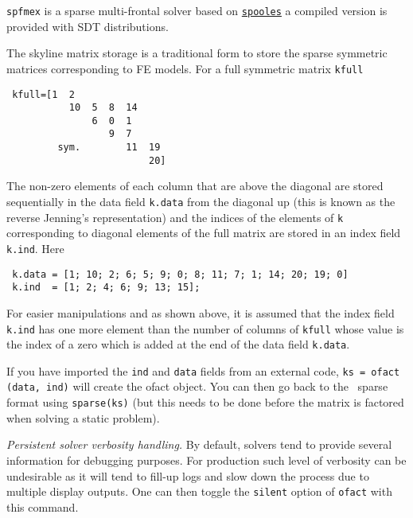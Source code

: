 \begin{SDT}

{\tt spfmex} is a sparse multi-frontal solver based on \href{http://www.netlib.org/linalg/spooles/spooles.2.2.html}{{\tt spooles}} a compiled version is provided with SDT distributions. 


 The skyline matrix storage is a traditional form to store the sparse symmetric matrices corresponding to FE models. For a full symmetric matrix {\tt kfull}

\begin{verbatim}
 kfull=[1  2
           10  5  8  14
               6  0  1
                  9  7
         sym.        11  19
                         20]
\end{verbatim}

The non-zero elements of each column that are above the diagonal are stored sequentially in the data field {\tt k.data} from the diagonal up (this is known as the reverse Jenning's representation) and the indices of the elements of {\tt k} corresponding to diagonal elements of the full matrix are stored in an index field {\tt k.ind}. Here

\begin{verbatim}
 k.data = [1; 10; 2; 6; 5; 9; 0; 8; 11; 7; 1; 14; 20; 19; 0]
 k.ind  = [1; 2; 4; 6; 9; 13; 15];
\end{verbatim}

For easier manipulations and as shown above, it is assumed that the index field {\tt k.ind} has one more element than the number of columns of {\tt kfull} whose value is the index of a zero which is added at the end of the data field {\tt k.data}.

If you have imported the {\tt ind} and {\tt data} fields from an external code, {\tt ks = ofact (data, ind)} will create the ofact object. You can then go back to the \matlab\ sparse format using {\tt sparse(ks)} (but this needs to be done before the matrix is factored when solving a static problem).



{\it Persistent solver verbosity handling.}
By default, solvers tend to provide several information for debugging purposes. For production such level of verbosity can be undesirable as it will tend to fill-up logs and slow down the process due to multiple display outputs. One can then toggle the {\tt silent} option of {\tt ofact} with this command.


\end{SDT}
